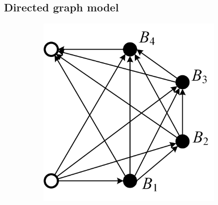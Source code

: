 \documentclass{article}
\begin{document}
\subsection{Directed graph model}

\begin{figure}[htbp]
    \centering
    \begin{subfigure}[b]{0.31\textwidth}
        \includegraphics[width=\textwidth]{direct-graph-he.png}
        \caption{}
        \label{fig:direct-graph-he}
    \end{subfigure}
    \hspace{0.02\textwidth}
    \begin{subfigure}[b]{0.23\textwidth}

\end{subfigure}
\end{figure}
\end{document}
